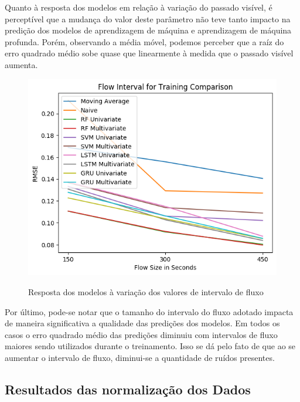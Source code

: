 Quanto à resposta dos modelos em relação à variação do passado visível, é perceptível que a mudança do valor deste parâmetro não teve tanto impacto na predição dos modelos de aprendizagem de máquina e aprendizagem de máquina profunda. Porém, observando a média móvel, podemos perceber que a raíz do erro quadrado médio sobe quase que linearmente à medida que o passado visível aumenta.

\begin{figure}[H]
    \centering
    \includegraphics[scale=0.8]{monography/img/flow_interval_for_training_comparison_rmse.png}
    \label{figure:rf}
    \caption{Resposta dos modelos à variação dos valores de intervalo de fluxo \textit{\acrshort{}}\footnotemark}
\end{figure}


Por último, pode-se notar que o tamanho do intervalo do fluxo adotado impacta de maneira significativa a qualidade das predições dos modelos. Em todos os casos o erro quadrado médio das predições diminuiu com intervalos de fluxo maiores sendo utilizados durante o treinamento. Isso se dá pelo fato de que ao se aumentar o intervalo de fluxo, diminui-se a quantidade de ruídos presentes.


\subsection{Resultados das normalização dos Dados}

